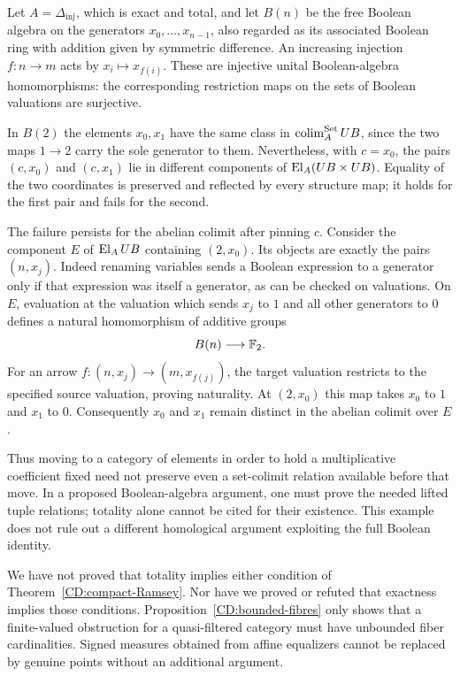 \begin{example}
\label{CD:pinning-counterexample}
Let $A=\Delta_{\mathrm{inj}}$, which is exact and total, and let
$B(n)$ be the free Boolean algebra on the generators
$x_0,\ldots,x_{n-1}$, also regarded as its associated Boolean ring
with addition given by symmetric difference. An increasing injection $f:n\to m$ acts by
$x_i\mapsto x_{f(i)}$. These are injective unital Boolean-algebra
homomorphisms: the corresponding restriction maps on the sets of
Boolean valuations are surjective.

In $B(2)$ the elements $x_0,x_1$ have the same class in
$\operatorname*{colim}_A^{\mathrm{Set}}UB$, since the two maps $1\to2$ carry the sole
generator to them. Nevertheless, with $c=x_0$, the pairs
$(c,x_0)$ and $(c,x_1)$ lie in different components of
$\operatorname{El}_A(UB\times UB)$. Equality of the two coordinates is preserved
and reflected by every structure map; it holds for the first pair
and fails for the second.

The failure persists for the abelian colimit after pinning $c$.
Consider the component $E$ of $\operatorname{El}_A UB$ containing $(2,x_0)$.
Its objects are exactly the pairs $(n,x_j)$. Indeed renaming
variables sends a Boolean expression to a generator only if that
expression was itself a generator, as can be checked on valuations.
On $E$, evaluation at the valuation which sends $x_j$ to $1$ and all
other generators to $0$ defines a natural homomorphism of additive
groups
\[
 B(n)\longrightarrow\mathbb F_2.
\]
For an arrow $f:(n,x_j)\to(m,x_{f(j)})$, the target valuation
restricts to the specified source valuation, proving naturality.
At $(2,x_0)$ this map takes $x_0$ to $1$ and $x_1$ to $0$.
Consequently $x_0$ and $x_1$ remain distinct in the abelian colimit
over $E$.

Thus moving to a category of elements in order to hold a multiplicative
coefficient fixed need not preserve even a set-colimit relation
available before that move. In a proposed Boolean-algebra argument,
one must prove the needed lifted tuple relations; totality alone
cannot be cited for their existence. This example does not rule out
a different homological argument exploiting the full Boolean identity.
\end{example}

\begin{obstruction}
\label{CD:unresolved}
We have not proved that totality implies either condition of
Theorem~\ref{CD:compact-Ramsey}. Nor have we proved or refuted that
exactness implies those conditions. Proposition~\ref{CD:bounded-fibres}
only shows that a finite-valued obstruction for a quasi-filtered
category must have unbounded fiber cardinalities. Signed measures
obtained from affine equalizers cannot be replaced by genuine points
without an additional argument.
\end{obstruction}
